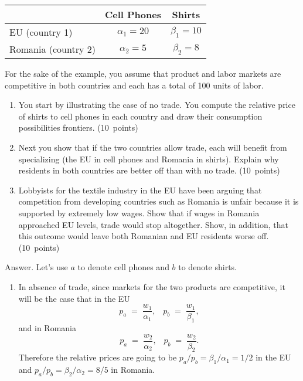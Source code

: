 \documentclass[letterpaper,12pt]{article}
\begin{document}
\begin{enumerate}
\begin{center}
\begin{tabular}{||l|c|c||}
\hline\hline%
                     &   Cell Phones       &      Shirts    \\%

\hline\hline%
EU (country 1)       &   $\alpha_{1}=20$   & $\beta_{1}=10$  \\%
\hline%
Romania (country 2)  &   $\alpha_{2}=5$    & $\beta_{2}=8$   \\%
\hline\hline%
\end{tabular}
\end{center}
For the sake of the example, you assume that product and labor
markets are competitive in both countries and each has a total of
100 units of labor.
%
\begin{enumerate}

\item You start by illustrating the case of no trade. You compute
the relative price of shirts to cell phones in each country and
draw their consumption possibilities frontiers. (10~points)

\item Next you show that if the two countries allow trade, each
will benefit from specializing (the EU in cell phones and Romania
in shirts).   
Explain why residents in both countries are better off than with no trade. (10~points)

\item Lobbyists for the textile industry in the EU have been
arguing that competition from developing countries such as Romania
is unfair because it is supported by extremely low wages. 
Show that if wages in Romania approached EU levels, 
trade would stop altogether. 
Show, in addition, that this outcome would leave both
Romanian and EU residents worse off. (10~points)

\end{enumerate}


Answer. Let's use $a$ to denote cell phones and $b$ to denote
shirts.
%
\begin{enumerate}

\item In absence of trade, since markets for the two products are
competitive, it will be the case that in the EU
%
\[ 
    p_{a} \;=\; \frac{w_{1}}{\alpha_{1}} , \;\;\;
    p_{b} \;=\; \frac{w_{1}}{\beta_{1}},
\] 
%
and in Romania
%
\[ 
    p_{a} \;=\; \frac{w_{2}}{\alpha_{2}} , \;\;\;
    p_{b} \;=\; \frac{w_{2}}{\beta_{2}}.
\] 
%
Therefore the relative prices are going to be
${p_{a}}/{p_{b}}= {\beta_{1}}/{\alpha_{1}} = {1}/{2}$ in
the EU and
${p_{a}}/{p_{b}} = {\beta_{2}}/{\alpha_{2}}= {8}/{5}$ in
Romania.


\end{enumerate}
\end{enumerate}
\end{document}
